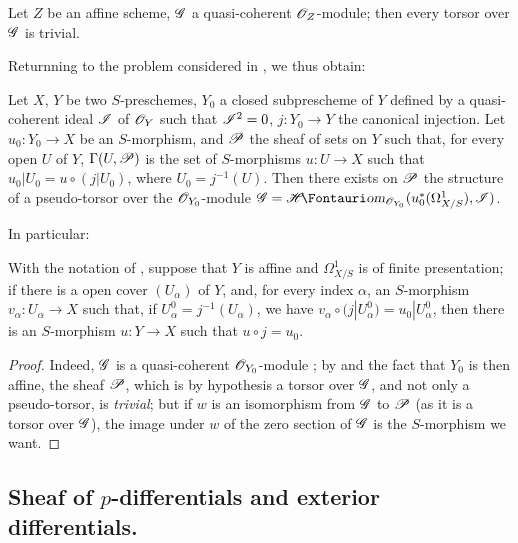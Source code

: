 \begin{proposition}[16.5.16]
\label{IV.16.5.16}
Let $Z$ be an affine scheme, $\mathscr{G}$ a quasi-coherent $\mathscr{O}_Z$-module;
then every torsor over $\mathscr{G}$ is trivial.
\end{proposition}

Returnning to the problem considered in , we thus obtain:

\begin{proposition}[16.5.17]
\label{IV.16.5.17}
Let $X$, $Y$ be two $S$-preschemes, $Y_0$ a closed subprescheme of $Y$ defined by a quasi-coherent ideal $\mathscr{I}$ of $\mathscr{O}_Y$ such that $\mathscr{I}^2 = 0$, $j : Y_0 \to Y$ the canonical injection.
Let $u_0:Y_0 \to X$ be an $S$-morphism, and $\mathscr{P}$ the sheaf of sets on $Y$ such that, for every open $U$ of $Y$, $\Gamma(U, \mathscr{P})$ is the set of $S$-morphisms $u : U \to X$ such that $u_0|U_0 = u \circ (j|U_0)$, where $U_0 = j^{-1}(U)$.
Then there exists on $\mathscr{P}$ the structure of a pseudo-torsor over the $\mathscr{O}_{Y_0}$-module $\sh{G} = \shHom_{\sh{O}_{Y_0}}(u_0^*(\Omega_{X/S}^1), \sh{I})$.
\end{proposition}

In particular:

\begin{corollary}[16.5.18]
\label{IV.16.5.18}
With the notation of , suppose that $Y$ is affine and $\Omega_{X/S}^1$ is of finite presentation;
if there is a open cover $(U_\alpha)$ of $Y$, and, for every index $\alpha$, an $S$-morphism $v_\alpha : U_\alpha \to X$ such that, if $U_\alpha^0 = j^{-1}(U_\alpha)$, we have $v_\alpha \circ (j|U_\alpha^0) = u_0|U_\alpha^0$, then there is an $S$-morphism $u : Y \to X$ such that $u \circ j = u_0$.
\end{corollary}

\begin{proof}
Indeed, $\mathscr{G}$ is a quasi-coherent $\mathscr{O}_{Y_0}$-module ;
by  and the fact that $Y_0$ is then affine, the sheaf $\mathscr{P}$, which is by hypothesis a torsor over $\mathscr{G}$, and not only a pseudo-torsor, is \emph{trivial};
but if $w$ is an isomorphism from $\mathscr{G}$ to $\mathscr{P}$ (as it is a torsor over $\mathscr{G}$), the image under $w$ of the zero section of $\mathscr{G}$ is the $S$-morphism we want.
\end{proof}

\subsection{Sheaf of $p$-differentials and exterior differentials.}
\label{IV.16.6}


